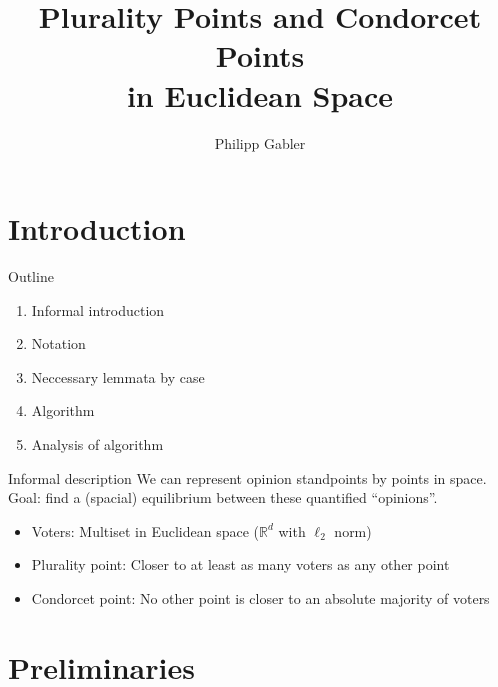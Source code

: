 \documentclass{beamer}
\author{Philipp Gabler}
\title{Plurality Points and Condorcet Points\\ in Euclidean Space}
\date{}
\newcommand{\RR}{\mathbb{R}}
\begin{document}
\beamertemplatenavigationsymbolsempty

\begin{frame}
  \maketitle
\end{frame}

\section{Introduction}

\begin{frame}{Outline}
  \begin{enumerate}
  \item Informal introduction
  \item Notation
  \item Neccessary lemmata by case
  \item Algorithm
  \item Analysis of algorithm
  \end{enumerate}
\end{frame}

\begin{frame}{Informal description}
  We can represent opinion standpoints by points in space.  Goal: find a (spacial) equilibrium
  between these quantified \enquote{opinions}.
  
  \begin{itemize}
  \item Voters: Multiset in Euclidean space (\(\RR^d\) with \(\ell_2\) norm)
  \item Plurality point: Closer to at least as many voters as any other point
  \item Condorcet point: No other point is closer to an absolute majority of voters
  \end{itemize}
\end{frame}


\section{Preliminaries}
\end{document}
